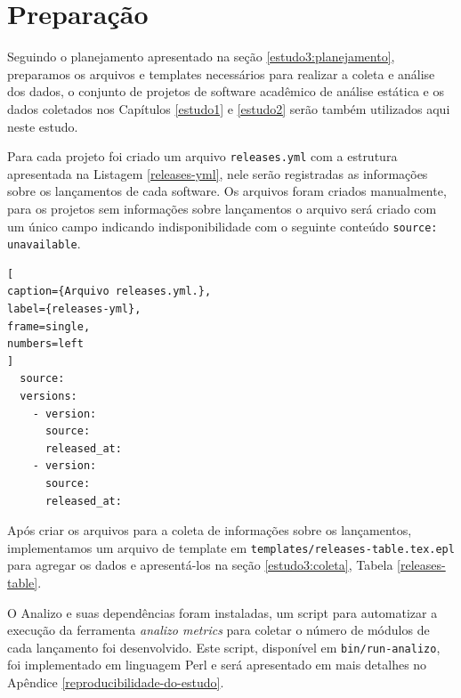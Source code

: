 

\section{Preparação} \label{estudo3:preparacao} %

Seguindo o planejamento apresentado na seção \ref{estudo3:planejamento},
preparamos os arquivos e templates necessários para realizar a coleta e análise
dos dados, o conjunto de projetos de software acadêmico de análise estática e
os dados coletados nos Capítulos \ref{estudo1} e \ref{estudo2} serão também
utilizados aqui neste estudo.

Para cada projeto foi criado um arquivo \texttt{releases.yml} com a estrutura
apresentada na Listagem \ref{releases-yml}, nele serão registradas as
informações sobre os lançamentos de cada software. Os arquivos foram criados
manualmente, para os projetos sem informações sobre lançamentos o arquivo será
criado com um único campo indicando indisponibilidade com o seguinte conteúdo
\texttt{source: unavailable}.

\begin{lstlisting}[
caption={Arquivo releases.yml.},
label={releases-yml},
frame=single,
numbers=left
]
  source:
  versions:
    - version:
      source:
      released_at:
    - version:
      source:
      released_at:
\end{lstlisting}

Após criar os arquivos para a coleta de informações sobre os lançamentos,
implementamos um arquivo de template em
\texttt{templates/releases-table.tex.epl} para agregar os dados e apresentá-los
na seção \ref{estudo3:coleta}, Tabela \ref{releases-table}.


O Analizo e suas dependências foram instaladas, um script para automatizar a
execução da ferramenta {\it analizo metrics} para coletar o número de módulos
de cada lançamento foi desenvolvido. Este script, disponível em
\texttt{bin/run-analizo}, foi implementado em linguagem Perl e será apresentado
em mais detalhes no Apêndice \ref{reproducibilidade-do-estudo}.


